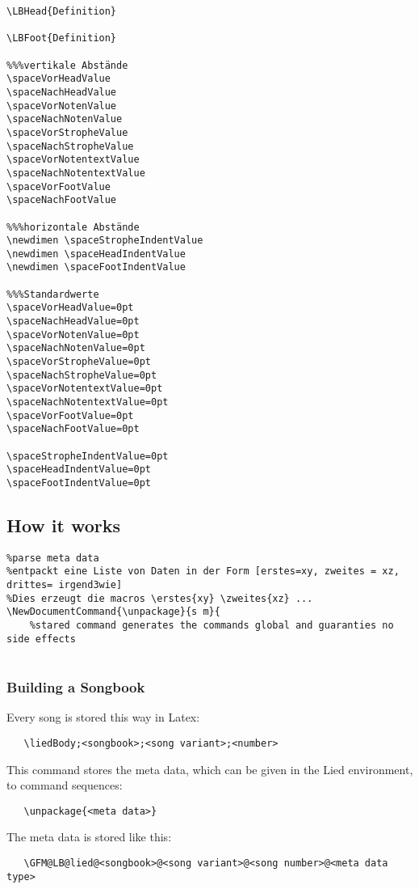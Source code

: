 \documentclass[12pt,a4paper]{scrreprt}
\begin{document}
\begin{verbatim}
\LBHead{Definition}

\LBFoot{Definition}

%%%vertikale Abstände
\spaceVorHeadValue
\spaceNachHeadValue
\spaceVorNotenValue
\spaceNachNotenValue
\spaceVorStropheValue
\spaceNachStropheValue
\spaceVorNotentextValue
\spaceNachNotentextValue
\spaceVorFootValue
\spaceNachFootValue

%%%horizontale Abstände
\newdimen \spaceStropheIndentValue
\newdimen \spaceHeadIndentValue
\newdimen \spaceFootIndentValue

%%%Standardwerte
\spaceVorHeadValue=0pt
\spaceNachHeadValue=0pt
\spaceVorNotenValue=0pt
\spaceNachNotenValue=0pt
\spaceVorStropheValue=0pt
\spaceNachStropheValue=0pt
\spaceVorNotentextValue=0pt
\spaceNachNotentextValue=0pt
\spaceVorFootValue=0pt
\spaceNachFootValue=0pt

\spaceStropheIndentValue=0pt
\spaceHeadIndentValue=0pt
\spaceFootIndentValue=0pt

\end{verbatim}

\subsection{How it works}

\begin{verbatim}
%parse meta data
%entpackt eine Liste von Daten in der Form [erstes=xy, zweites = xz, drittes= irgend3wie]
%Dies erzeugt die macros \erstes{xy} \zweites{xz} ...
\NewDocumentCommand{\unpackage}{s m}{
	%stared command generates the commands global and guaranties no side effects
	
\end{verbatim}

\subsubsection{Building a Songbook}
Every song is stored this way in Latex:
\begin{verbatim}
   \liedBody;<songbook>;<song variant>;<number>
\end{verbatim}


This command stores the meta data, which can be given in the Lied environment, to command sequences:
\begin{verbatim}
   \unpackage{<meta data>}
\end{verbatim}

The meta data is stored like this:
\begin{verbatim}
   \GFM@LB@lied@<songbook>@<song variant>@<song number>@<meta data type>
\end{verbatim}
\end{document}
